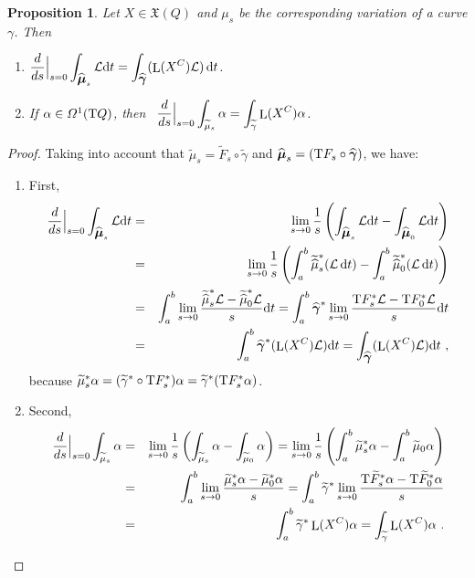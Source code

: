 \documentclass[12pt]{report}
\newtheorem{prop}[teor]{Proposition}
\def\dst{\displaystyle}
\def\qed{\ifvmode\removelastskip\fi
{\unskip\nobreak\hfil\penalty50\hbox{}\nobreak\hfil
\hbox{\vrule height1.2ex width1.2ex}\parfillskip=0pt
\finalhyphendemerits=0 \par\smallskip}}
\def\vf{\mathfrak X}
\def\Lag{{\cal L}}
\def\d{{\rm d}}
\def\Tan{{\rm T}}
\def\Lie{\mathop{\rm L}\nolimits}
\begin{document}
\begin{prop}
Let  $X\in\vf(Q)$ and $\mu_s$ be the corresponding variation of a curve $\gamma$. Then
\begin{enumerate}
\item
\(\dst \frac{d}{d s}\Big\vert_{s=0}\int_{\widehat{\mbox{\boldmath$\mu$}}_s}\Lag \d t=
\int_{\widehat{\mbox{\boldmath$\gamma$}}}(\Lie (X^C)\Lag)\,\d t\).
\item
If $\alpha \in {\mit\Omega}^1(\Tan Q)$, then \
$\displaystyle\frac{d}{d s}\Big\vert_{s=0}\int_{\widetilde{\mu}_s}\alpha =
\int_{\widetilde \gamma}\Lie (X^C)\alpha$.
\end{enumerate}
\end{prop}
\begin{proof}
Taking into account that
$\widetilde  \mu_s = \widetilde  F_s\circ\widetilde  \gamma$ and $\widehat{\mbox{\boldmath$\mu$}}_s=(\Tan F_s\circ\widehat{\mbox{\boldmath$\gamma$}})$,
we have:
\begin{enumerate}
\item
First,
\begin{eqnarray*}
\frac{d}{d s}\Big\vert_{s=0}\int_{\widehat{\mbox{\boldmath$\mu$}}_s}\Lag \d t &=&
\lim_{s\to 0}\frac{1}{s}\left(\int_{\widehat{\mbox{\boldmath$\mu$}}_s}\Lag \d t-
\int_{\widehat{\mbox{\boldmath$\mu$}}_0}\Lag \d t\right)
\\ &=&
\lim_{s\to 0}\frac{1}{s}\left(\int_a^b\widetilde  {\widehat\mu}_s^*(\Lag\,\d t)-
\int_a^b\widetilde  {\widehat\mu}_0^*(\Lag\,\d t)\right)
\\ &=&
\int_a^b\lim_{s\to 0}\frac{\widetilde  {\widehat\mu}_s^*\Lag -\widetilde  {\widehat\mu}_0^*\Lag}{s}\d t
=\int_a^b\widehat{\mbox{\boldmath$\gamma$}}^{*}\lim_{s\to 0}\frac{\Tan  F_s^*\Lag -\Tan  F_0^*\Lag}{s}\d t
\\&=&
\int_a^b\widehat{\mbox{\boldmath$\gamma$}}^{*}(\Lie ( X^C)\Lag) \d t =
\int_{\widehat{\mbox{\boldmath$\gamma$}}} (\Lie(X^C)\Lag )\d t \ ,
\end{eqnarray*}
because 
$\widetilde  \mu_s^{*}\alpha = (\widetilde  \gamma^{*}\circ\Tan  F_s^{*})\alpha=\widetilde  \gamma^{*}(\Tan  F_s^{*}\alpha)$.
\item
Second,
\begin{eqnarray*}
\frac{d}{d s}\Big\vert_{s=0}\int_{\widetilde  \mu_s}\alpha &=&
\lim_{s\to 0}\frac{1}{s}\left(\int_{\widetilde  \mu_s}\alpha -
\int_{\widetilde  \mu_0}\alpha\right)
=\lim_{s\to 0}\frac{1}{s}\left(\int_a^b\widetilde  \mu_s^*\alpha -
\int_a^b\widetilde  \mu_0\alpha\right)
\\ &=&
\int_a^b\lim_{s\to 0}\frac{\widetilde  \mu_s^*\alpha -\widetilde  \mu_0^*\alpha}{s}
=
\int_a^b\widetilde\gamma^*\lim_{s\to 0}\frac{\Tan\widetilde  F_s^*\alpha -\Tan\widetilde  F_0^*\alpha}{s}
\\&=&
\int_a^b\widetilde\gamma^*\Lie (X^C)\alpha=
\int_{\widetilde  \gamma} \Lie(X^C)\alpha \ .
\end{eqnarray*}
\end{enumerate}
\qed \end{proof}
\end{document}
